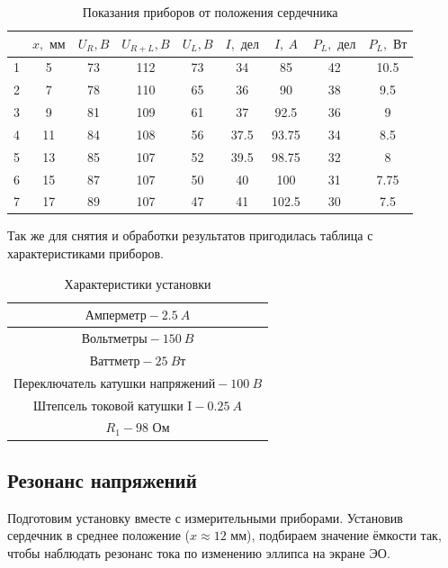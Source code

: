\documentclass[a4paper, 12pt]{article}%
\begin{document}
\begin{table}[!h]
\begin{tabular}{|c|c|c|c|c|c|c|c|c|}
\hline 
  & $x, \text{ мм}$ & $U_R, B$ & $U_{R+L}, B$ & $U_L, B$ & $I, \text{ дел}$ & $I,\ A$ & $P_L,\text{ дел}$ & $P_L,\text{ Вт}$ \\ 
\hline 
1 & 5 & 73 & 112 & 73 & 34 & 85 & 42 & 10.5 \\ 
\hline 
2 & 7 & 78 & 110 & 65 & 36 & 90 & 38 & 9.5 \\ 
\hline 
3 & 9 & 81 & 109 & 61 & 37 & 92.5 & 36 & 9 \\ 
\hline 
4 & 11 & 84 & 108 & 56 & 37.5 & 93.75 & 34 & 8.5 \\ 
\hline 
5 & 13 & 85 & 107 & 52 & 39.5 & 98.75 & 32 & 8 \\ 
\hline 
6 & 15 & 87 & 107 & 50 & 40 & 100 & 31 & 7.75 \\ 
\hline 
7 & 17 & 89 & 107 & 47 & 41 & 102.5 & 30 & 7.5 \\ 
\hline 
\end{tabular} 
\caption{Показания приборов от положения сердечника}
\end{table}

Так же для снятия и обработки результатов пригодилась таблица с характеристиками приборов.

\begin{table}[!h]
\begin{center}
\begin{tabular}{|c|}
\hline 
$\text{Амперметр} - 2.5\ A$ \\ 
\hline 
$\text{Вольтметры} - 150\ B$ \\ 
\hline 
$\text{Ваттметр}   - 25\ Bт$ \\ 
\hline 
$\text{Переключатель катушки напряжений} - 100\ B$ \\ 
\hline 
$\text{Штепсель токовой катушки I} - 0.25\ A$ \\ 
\hline 
$R_1 - 98 \text{ Ом}$ \\ 
\hline 
\end{tabular} 
\caption{Характеристики установки}
\end{center}
\end{table}

\subsection{Резонанс напряжений}

Подготовим установку вместе с измерительными приборами. Установив сердечник в среднее положение ($x \approx 12 \text{ мм}$), подбираем значение ёмкости так, чтобы наблюдать резонанс тока по изменению эллипса на экране ЭО.
\end{document}
